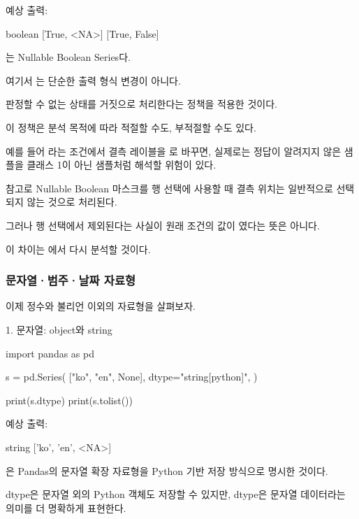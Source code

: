 예상 출력:

\begin{dhkzsh}
boolean
[True, <NA>]
[True, False]
\end{dhkzsh}

는 Nullable Boolean Series다.

여기서 는 단순한 출력 형식 변경이 아니다.

판정할 수 없는 상태를 거짓으로 처리한다는 정책을 적용한 것이다.

이 정책은 분석 목적에 따라 적절할 수도, 부적절할 수도 있다.

예를 들어 라는 조건에서 결측 레이블을 로 바꾸면, 실제로는 정답이 알려지지 않은 샘플을 클래스 1이 아닌 샘플처럼 해석할 위험이 있다.

참고로 Nullable Boolean 마스크를 행 선택에 사용할 때 결측 위치는 일반적으로 선택되지 않는 것으로 처리된다.

그러나 행 선택에서 제외된다는 사실이 원래 조건의 값이 였다는 뜻은 아니다.

이 차이는 에서 다시 분석할 것이다.

\subsubsection{문자열·범주·날짜 자료형}

이제 정수와 불리언 이외의 자료형을 살펴보자.

\begin{dhknote}
\begin{dhksmry}[centered]
1. 문자열: object와 string
\end{dhksmry}
\end{dhknote}

\begin{dhkcode}
import pandas as pd

s = pd.Series(
    ["ko", "en", None],
    dtype="string[python]",
)

print(s.dtype)
print(s.tolist())
\end{dhkcode}

예상 출력:

\begin{dhkzsh}
string
['ko', 'en', <NA>]
\end{dhkzsh}

은 Pandas의 문자열 확장 자료형을 Python 기반 저장 방식으로 명시한 것이다.

 dtype은 문자열 외의 Python 객체도 저장할 수 있지만,  dtype은 문자열 데이터라는 의미를 더 명확하게 표현한다.

